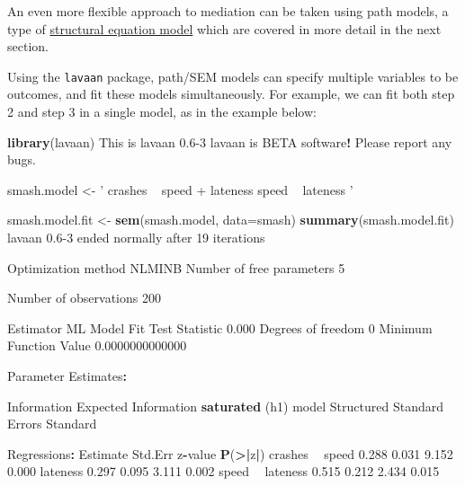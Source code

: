 \documentclass[]{article}
\newenvironment{Shaded}{\begin{snugshade}}{\end{snugshade}}
\newcommand{\DataTypeTok}[1]{\textcolor[rgb]{0.13,0.29,0.53}{#1}}
\newcommand{\DecValTok}[1]{\textcolor[rgb]{0.00,0.00,0.81}{#1}}
\newcommand{\ErrorTok}[1]{\textcolor[rgb]{0.64,0.00,0.00}{\textbf{#1}}}
\newcommand{\FloatTok}[1]{\textcolor[rgb]{0.00,0.00,0.81}{#1}}
\newcommand{\KeywordTok}[1]{\textcolor[rgb]{0.13,0.29,0.53}{\textbf{#1}}}
\newcommand{\NormalTok}[1]{#1}
\newcommand{\OperatorTok}[1]{\textcolor[rgb]{0.81,0.36,0.00}{\textbf{#1}}}
\newcommand{\StringTok}[1]{\textcolor[rgb]{0.31,0.60,0.02}{#1}}
\begin{document}
An even more flexible approach to mediation can be taken using path models, a
type of \protect\hyperlink{covariance-modelling}{structural equation model} which are covered in
more detail in the next section.

Using the \texttt{lavaan} package, path/SEM models can specify multiple variables to be
outcomes, and fit these models simultaneously. For example, we can fit both step
2 and step 3 in a single model, as in the example below:

\begin{Shaded}
\begin{Highlighting}[]
\KeywordTok{library}\NormalTok{(lavaan)}
\NormalTok{This is lavaan }\FloatTok{0.6}\DecValTok{-3}
\NormalTok{lavaan is BETA software}\OperatorTok{!}\StringTok{ }\NormalTok{Please report any bugs.}

\NormalTok{smash.model <-}\StringTok{ '}
\StringTok{  crashes ~ speed + lateness}
\StringTok{  speed ~ lateness}
\StringTok{'}

\NormalTok{smash.model.fit <-}\StringTok{ }\KeywordTok{sem}\NormalTok{(smash.model, }\DataTypeTok{data=}\NormalTok{smash)}
\KeywordTok{summary}\NormalTok{(smash.model.fit)}
\NormalTok{lavaan }\FloatTok{0.6}\DecValTok{-3}\NormalTok{ ended normally after }\DecValTok{19}\NormalTok{ iterations}

\NormalTok{  Optimization method                           NLMINB}
\NormalTok{  Number of free parameters                          }\DecValTok{5}

\NormalTok{  Number of observations                           }\DecValTok{200}

\NormalTok{  Estimator                                         ML}
\NormalTok{  Model Fit Test Statistic                       }\FloatTok{0.000}
\NormalTok{  Degrees of freedom                                 }\DecValTok{0}
\NormalTok{  Minimum Function Value               }\FloatTok{0.0000000000000}

\NormalTok{Parameter Estimates}\OperatorTok{:}

\StringTok{  }\NormalTok{Information                                 Expected}
\NormalTok{  Information }\KeywordTok{saturated}\NormalTok{ (h1) model          Structured}
\NormalTok{  Standard Errors                             Standard}

\NormalTok{Regressions}\OperatorTok{:}
\StringTok{                   }\NormalTok{Estimate  Std.Err  z}\OperatorTok{-}\NormalTok{value  }\KeywordTok{P}\NormalTok{(}\OperatorTok{>}\ErrorTok{|}\NormalTok{z}\OperatorTok{|}\NormalTok{)}
\NormalTok{  crashes }\OperatorTok{~}\StringTok{                                           }
\StringTok{    }\NormalTok{speed             }\FloatTok{0.288}    \FloatTok{0.031}    \FloatTok{9.152}    \FloatTok{0.000}
\NormalTok{    lateness          }\FloatTok{0.297}    \FloatTok{0.095}    \FloatTok{3.111}    \FloatTok{0.002}
\NormalTok{  speed }\OperatorTok{~}\StringTok{                                             }
\StringTok{    }\NormalTok{lateness          }\FloatTok{0.515}    \FloatTok{0.212}    \FloatTok{2.434}    \FloatTok{0.015}


\end{Highlighting}
\end{Shaded}
\end{document}
